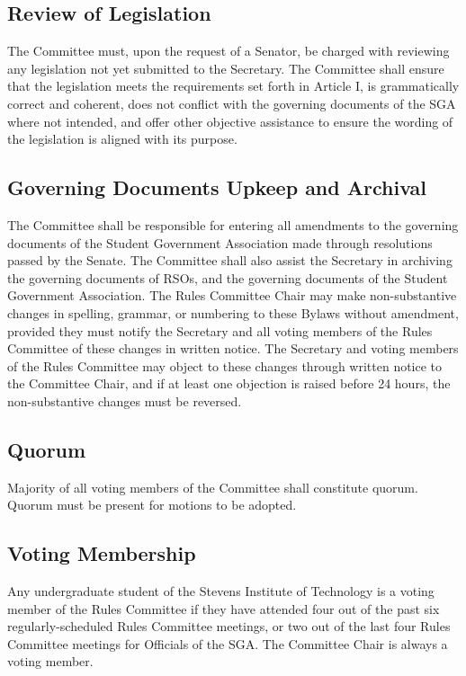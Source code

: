 \documentclass[12pt]{scrreprt}
\begin{document}
\subsection{Review of Legislation}
The Committee must, upon the request of a Senator, be charged with reviewing any legislation not yet submitted to the Secretary. The Committee shall ensure that the legislation meets the requirements set forth in Article I, is grammatically correct and coherent, does not conflict with the governing documents of the SGA where not intended, and offer other objective assistance to ensure the wording of the legislation is aligned with its purpose.

\subsection{Governing Documents Upkeep and Archival} \label{sec:document_archival}
The Committee shall be responsible for entering all amendments to the governing documents of the
Student Government Association made through resolutions passed by the Senate. The Committee shall also assist the Secretary in archiving the governing documents of RSOs, and the governing documents of the Student Government Association. The Rules Committee Chair may make non-substantive
changes in spelling, grammar, or numbering to these Bylaws without amendment, provided
they must notify the Secretary and all voting members of the Rules Committee of these
changes in written notice. The Secretary and voting members of the Rules Committee may
object to these changes through written notice to the Committee Chair, and if at least one
objection is raised before 24 hours, the non-substantive changes must be reversed.

\subsection{Quorum}
Majority of all voting members of the Committee shall constitute quorum. Quorum must be
present for motions to be adopted.

\subsection{Voting Membership}
Any undergraduate student of the Stevens Institute of Technology is a voting member of the
Rules Committee if they have attended four out of the past six regularly-scheduled Rules
Committee meetings, or two out of the last four Rules Committee meetings for Officials of the
SGA. The Committee Chair is always a voting member.
\end{document}
